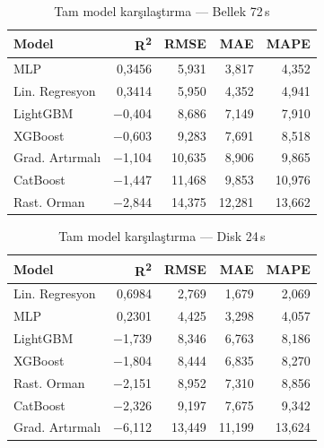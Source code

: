 \begin{ekler}
\begin{table}[htbp]
    \centering
    \caption{Tam model karşılaştırma — Bellek 72\,s}
    \begin{tabular}{lrrrr}
        \textbf{Model} & \textbf{R\textsuperscript{2}} & \textbf{RMSE} & \textbf{MAE} & \textbf{MAPE} \\
        \hline
        MLP             & 0{,}3456   & 5{,}931  & 3{,}817  & 4{,}352  \\
        Lin. Regresyon  & 0{,}3414   & 5{,}950  & 4{,}352  & 4{,}941  \\
        LightGBM        & $-$0{,}404  & 8{,}686 & 7{,}149  & 7{,}910  \\
        XGBoost         & $-$0{,}603  & 9{,}283 & 7{,}691  & 8{,}518  \\
        Grad. Artırmalı & $-$1{,}104  & 10{,}635 & 8{,}906 & 9{,}865  \\
        CatBoost        & $-$1{,}447  & 11{,}468 & 9{,}853 & 10{,}976 \\
        Rast. Orman     & $-$2{,}844  & 14{,}375 & 12{,}281 & 13{,}662 \\
    \end{tabular}
\end{table}

\begin{table}[htbp]
    \centering
    \caption{Tam model karşılaştırma — Disk 24\,s}
    \begin{tabular}{lrrrr}
        \textbf{Model} & \textbf{R\textsuperscript{2}} & \textbf{RMSE} & \textbf{MAE} & \textbf{MAPE} \\
        \hline
        Lin. Regresyon  & 0{,}6984   & 2{,}769  & 1{,}679  & 2{,}069  \\
        MLP             & 0{,}2301   & 4{,}425  & 3{,}298  & 4{,}057  \\
        LightGBM        & $-$1{,}739  & 8{,}346 & 6{,}763  & 8{,}186  \\
        XGBoost         & $-$1{,}804  & 8{,}444 & 6{,}835  & 8{,}270  \\
        Rast. Orman     & $-$2{,}151  & 8{,}952 & 7{,}310  & 8{,}856  \\
        CatBoost        & $-$2{,}326  & 9{,}197 & 7{,}675  & 9{,}342  \\
        Grad. Artırmalı & $-$6{,}112  & 13{,}449 & 11{,}199 & 13{,}624 \\
    \end{tabular}
\end{table}


\end{ekler}
